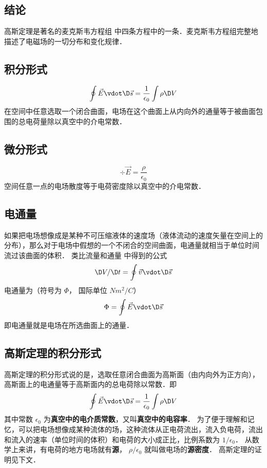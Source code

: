 
\subsection{结论}

高斯定理是著名的麦克斯韦方程组%
中四条方程中的一条．麦克斯韦方程组完整地描述了电磁场的一切分布和变化规律．

\subsection{积分形式}    
\begin{equation}
\oint {\vec E \vdot \D \vec s}  = \frac{1}{{{\epsilon _0}}}\int {\rho \D V} 
\end{equation}               
在空间中任意选取一个闭合曲面，电场在这个曲面上从内向外的通量等于被曲面包围的总电荷量除以真空中的介电常数．

\subsection{微分形式} 
\begin{equation}
\div \vec E = \frac{\rho }{{{\epsilon _0}}}
\end{equation}                      
空间任意一点的电场散度等于电荷密度除以真空中的介电常数．


\subsection{电通量}

如果把电场想像成是某种不可压缩液体的速度场（液体流动的速度矢量在空间上的分布），那么对于电场中假想的一个不闭合的空间曲面，电通量就相当于单位时间流过该曲面的体积．
类比流量和通量%
中得到的公式
\begin{equation}
\D V/\D t = \oint {\vec v \vdot \D \vec s} 
\end{equation} 
电通量为（符号为 $\Phi $， 国际单位 $N{m^2}/C$）
\begin{equation}
\Phi  = \oint {\vec E \vdot \D \vec s} 
\end{equation} 
即电通量就是电场在所选曲面上的通量．


\subsection{高斯定理的积分形式}

高斯定理的积分形式说的是，选取任意闭合曲面为高斯面（由内向外为正方向），高斯面上的电通量等于高斯面内的总电荷除以常数．即
\begin{equation}
\oint {\vec E \vdot \D \vec s}  = \frac{1}{{{\epsilon _0}}}\int {\rho  \D V} 
\end{equation} 
其中常数 ${\epsilon _0}$ 为\textbf{真空中的电介质常数}，又叫\textbf{真空中的电容率}．
为了便于理解和记忆，可以把电场想像成某种流体的场，这种流体从正电荷流出，流入负电荷，流出和流入的速率（单位时间的体积）和电荷的大小成正比，比例系数为 $1/{\epsilon _0}$． 从数学上来讲，有电荷的地方电场就有\textbf{源}， $\rho /{\epsilon _0}$ 就叫做电场的\textbf{源密度}． 高斯定理的证明见下文．


